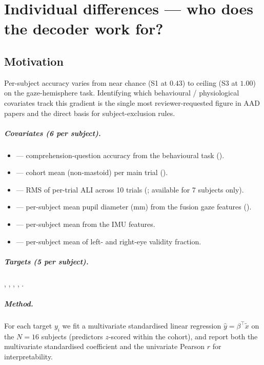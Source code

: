 \chapter{Individual differences --- who does the decoder work for?}
\label{ch:indiv-diff}

\section{Motivation}

Per-subject accuracy varies from near chance (S1 at $0.43$) to ceiling
(S3 at $1.00$) on the gaze-hemisphere task. Identifying which
behavioural / physiological covariates track this gradient is the
single most reviewer-requested figure in AAD papers and the direct
basis for subject-exclusion rules.

\paragraph{Covariates (6 per subject).}
\begin{itemize}
  \item {} --- comprehension-question accuracy from the
        behavioural task ().
  \item {} --- cohort mean 
        (non-mastoid) per main trial
        ().
  \item {} --- RMS of per-trial ALI across 10 trials
        (; available for 7
        subjects only).
  \item {} --- per-subject mean pupil diameter (mm) from
        the fusion gaze features ().
  \item {} --- per-subject mean
         from the IMU features.
  \item {} --- per-subject mean of left- and
        right-eye validity fraction.
\end{itemize}

\paragraph{Targets (5 per subject).}
, , ,
, .

\paragraph{Method.} For each target $y_i$ we fit a multivariate
standardised linear regression $\hat y = \beta^\top \tilde x$ on the
$N=16$ subjects (predictors $z$-scored within the cohort), and report
both the multivariate standardised coefficient and the univariate
Pearson $r$ for interpretability.


